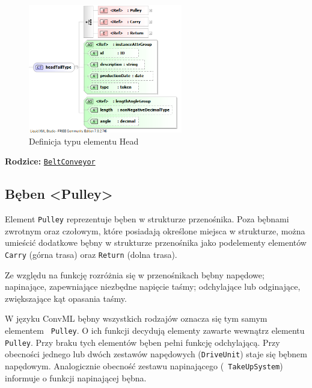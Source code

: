 \documentclass[12pt,a4paper]{article}
\begin{document}
\begin{figure}[H]
  \centering
  \includegraphics[width=0.6\textwidth]{png/liquid/headTailType}
  \caption{Definicja typu elementu Head}
  \label{fig:headTailType-xsd}
\end{figure}

\noindent\textbf{Rodzice:} \texttt{\hyperref[sec:BeltConveyor]{BeltConveyor}}


\subsection{Bęben <Pulley>}
Element {\tt Pulley} reprezentuje bęben w strukturze przenośnika.  Poza bębnami
zwrotnym oraz czołowym, które posiadają określone miejsca w strukturze, można
umieścić dodatkowe bębny w strukturze przenośnika jako podelementy elementów
{\tt Carry} (górna trasa) oraz {\tt Return} (dolna trasa).

Ze względu na funkcję rozróżnia się w przenośnikach bębny napędowe; napinające,
zapewniające niezbędne napięcie taśmy; odchylające lub odginające, zwiększające
kąt opasania taśmy.

W języku ConvML bębny wszystkich rodzajów oznacza się tym samym elementem {\tt
  Pulley}.  O ich funkcji decydują elementy zawarte wewnątrz elementu {\tt
  Pulley}. Przy braku tych elementów bęben pełni funkcję odchylającą.  Przy
obecności jednego lub dwóch zestawów napędowych ({\tt DriveUnit}) staje się
bębnem napędowym.  Analogicznie obecność zestawu napinającego ({\tt
  TakeUpSystem}) informuje o funkcji napinającej bębna.
\end{document}
